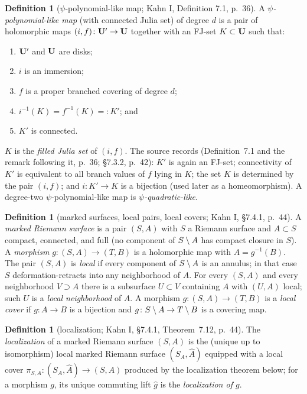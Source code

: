 \documentclass[11pt,reqno]{amsart}
\theoremstyle{definition}
\newtheorem{definition}[theorem]{Definition}
\theoremstyle{remark}
\begin{document}
\begin{definition}[\(\psi\)-polynomial-like map; Kahn I, Definition 7.1, p.~36]\label{def:psipl}
A \emph{\(\psi\)-polynomial-like map} (with connected Julia set) of degree
\(d\) is a pair of holomorphic maps \((i,f)\colon\mathbf{U}'\to\mathbf{U}\) together
with an FJ-set \(K\subset\mathbf{U}\) such that:
\begin{enumerate}
\item \(\mathbf{U}'\) and \(\mathbf{U}\) are disks;
\item \(i\) is an immersion;
\item \(f\) is a proper branched covering of degree \(d\);
\item \(i^{-1}(K)=f^{-1}(K)=:K'\); and
\item \(K'\) is connected.
\end{enumerate}
\(K\) is the \emph{filled Julia set} of \((i,f)\).  The source records
(Definition~7.1 and the remark following it, p.~36; \S7.3.2, p.~42): \(K'\) is again an FJ-set; connectivity of \(K'\)
is equivalent to all branch values of \(f\) lying in \(K\); the set
\(K\) is determined by the pair \((i,f)\); and
\(i\colon K'\to K\) is a bijection (used later as a homeomorphism).
A degree-two \(\psi\)-polynomial-like map is \emph{\(\psi\)-quadratic-like}.
\end{definition}

\begin{definition}[marked surfaces, local pairs, local covers; Kahn I, \S7.4.1, p.~44]\label{def:local}
A \emph{marked Riemann surface} is a pair \((S,A)\) with \(S\) a Riemann
surface and \(A\subset S\) compact, connected, and full (no component of
\(S\setminus A\) has compact closure in \(S\)).  A \emph{morphism}
\(g\colon(S,A)\to(T,B)\) is a holomorphic map with \(A=g^{-1}(B)\).
The pair \((S,A)\) is \emph{local} if every component of \(S\setminus A\) is
an annulus; in that case \(S\) deformation-retracts into any
neighborhood of \(A\).  For every \((S,A)\) and every neighborhood
\(V\supset A\) there is a subsurface \(U\subset V\) containing \(A\)
with \((U,A)\) local; such \(U\) is a \emph{local neighborhood} of
\(A\).  A morphism \(g\colon(S,A)\to(T,B)\) is a \emph{local cover} if
\(g\colon A\to B\) is a bijection and \(g\colon S\setminus A\to T\setminus B\) is a
covering map.
\end{definition}

\begin{definition}[localization; Kahn I, \S7.4.1, Theorem~7.12, p.~44]\label{def:localization}
The \emph{localization} of a marked Riemann surface \((S,A)\) is the
(unique up to isomorphism) local marked Riemann surface
\((S_A,\widehat A)\) equipped with a local cover
\(\pi_{S,A}\colon(S_A,\widehat A)\to(S,A)\) produced by the
localization theorem below; for a morphism \(g\), its unique commuting
lift \(\widehat g\) is the \emph{localization of \(g\)}.
\end{definition}
\end{document}
